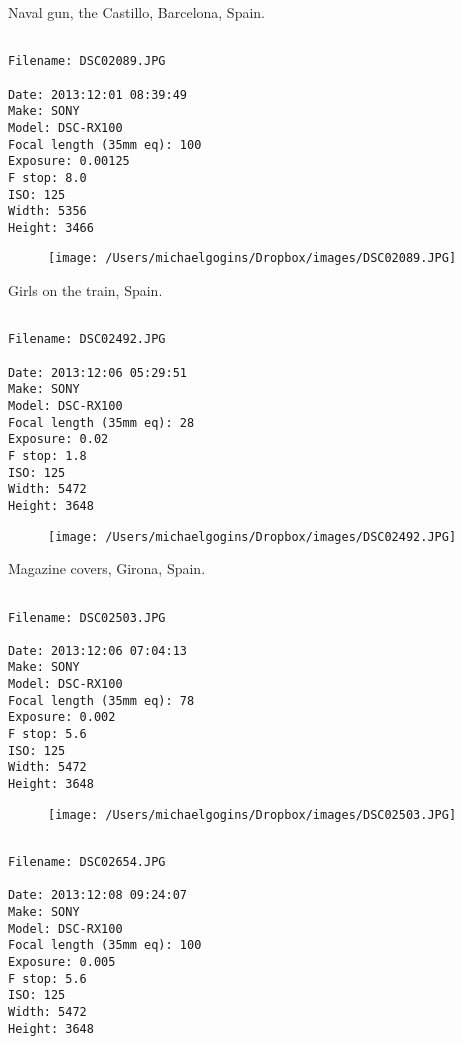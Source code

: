 \documentclass[11pt,letter,DIV=14,paper=landscape]{scrbook}
\begin{document}
\clearpage
\noindent Naval gun, the Castillo, Barcelona, Spain.
\noindent
\begin{lstlisting}

Filename: DSC02089.JPG

Date: 2013:12:01 08:39:49
Make: SONY
Model: DSC-RX100
Focal length (35mm eq): 100
Exposure: 0.00125
F stop: 8.0
ISO: 125
Width: 5356
Height: 3466
\end{lstlisting}
\clearpage

\begin{figure}
\texttt{[image: /Users/michaelgogins/Dropbox/images/DSC02089.JPG]}
\end{figure}
    
\clearpage
\noindent Girls on the train, Spain.
\noindent
\begin{lstlisting}

Filename: DSC02492.JPG

Date: 2013:12:06 05:29:51
Make: SONY
Model: DSC-RX100
Focal length (35mm eq): 28
Exposure: 0.02
F stop: 1.8
ISO: 125
Width: 5472
Height: 3648
\end{lstlisting}
\clearpage

\begin{figure}
\texttt{[image: /Users/michaelgogins/Dropbox/images/DSC02492.JPG]}
\end{figure}
    
\clearpage
\noindent Magazine covers, Girona, Spain.
\noindent
\begin{lstlisting}

Filename: DSC02503.JPG

Date: 2013:12:06 07:04:13
Make: SONY
Model: DSC-RX100
Focal length (35mm eq): 78
Exposure: 0.002
F stop: 5.6
ISO: 125
Width: 5472
Height: 3648
\end{lstlisting}
\clearpage

\begin{figure}
\texttt{[image: /Users/michaelgogins/Dropbox/images/DSC02503.JPG]}
\end{figure}
    
\clearpage
\noindent 
\noindent
\begin{lstlisting}

Filename: DSC02654.JPG

Date: 2013:12:08 09:24:07
Make: SONY
Model: DSC-RX100
Focal length (35mm eq): 100
Exposure: 0.005
F stop: 5.6
ISO: 125
Width: 5472
Height: 3648
\end{lstlisting}
\clearpage
\end{document}
